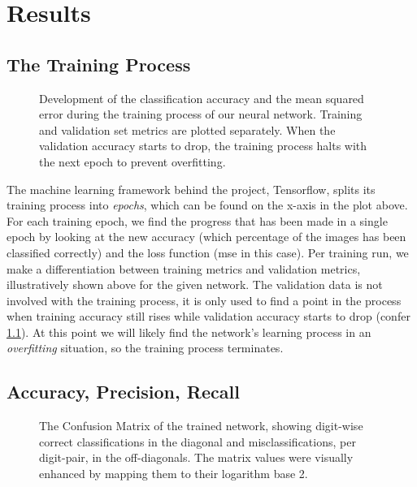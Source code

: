 \chapter{Results}
\label{chap:results}

\section{The Training Process}
\begin{figure}[H]
  \centering
  \pgfplotsset{/pgfplots/group/.cd,vertical sep=1.6cm}
  \caption[Classification accuracy and loss development during training]{
    Development of the classification accuracy and the mean squared error during the training process of our neural network.
    Training and validation set metrics are plotted separately.
    When the validation accuracy starts to drop, the training process halts with the next epoch to prevent overfitting.
  }
  \label{fig:training-history}
\end{figure}

The machine learning framework behind the project, Tensorflow, splits its training process into \textit{epochs}, which can be found on the x-axis in the plot above.
For each training epoch, we find the progress that has been made in a single epoch by looking at the new accuracy (which percentage of the images has been classified correctly) and the loss function (\gls{mse} in this case).
Per training run, we make a differentiation between training metrics and validation metrics, illustratively shown above for the given network.
The validation data is not involved with the training process, it is only used to find a point in the process when training accuracy still rises while validation accuracy starts to drop (confer \cref{fig:training-history}).
At this point we will likely find the network's learning process in an \textit{overfitting} situation, so the training process terminates.

\section{Accuracy, Precision, Recall}
\label{sec:accuracy-precision-recall}
\begin{figure}[H]
  \centering
  \caption[Confusion Matrix of the trained network]{
    The Confusion Matrix of the trained network, showing digit-wise correct classifications in the diagonal and misclassifications, per digit-pair, in the off-diagonals.
    The matrix values were visually enhanced by mapping them to their logarithm base 2.
  }
  \label{fig:confusion-matrix}
\end{figure}

